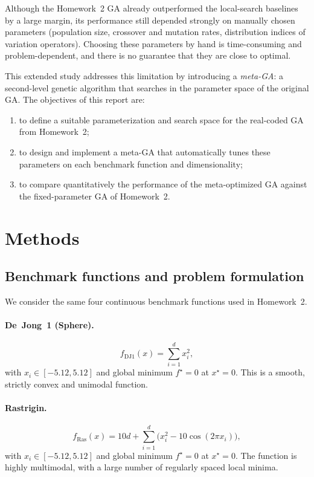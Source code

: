 \documentclass[11pt]{article}
\begin{document}
Although the Homework~2 GA already outperformed the local-search baselines
by a large margin, its performance still depended strongly on manually chosen
parameters (population size, crossover and mutation rates, distribution
indices of variation operators).
Choosing these parameters by hand is time-consuming and problem-dependent,
and there is no guarantee that they are close to optimal.

This extended study addresses this limitation by introducing a \emph{meta-GA}:
a second-level genetic algorithm that searches in the parameter space of the
original GA.
The objectives of this report are:
\begin{enumerate}
  \item to define a suitable parameterization and search space for the
        real-coded GA from Homework~2;
  \item to design and implement a meta-GA that automatically tunes these
        parameters on each benchmark function and dimensionality;
  \item to compare quantitatively the performance of the meta-optimized GA
        against the fixed-parameter GA of Homework~2.
\end{enumerate}

\section{Methods}

\subsection{Benchmark functions and problem formulation}

We consider the same four continuous benchmark functions used in Homework~2.

\paragraph{De~Jong~1 (Sphere).}
\begin{equation}
  f_{\text{DJ1}}(x) = \sum_{i=1}^{d} x_i^2,
\end{equation}
with $x_i \in [-5.12, 5.12]$ and global minimum $f^\star = 0$ at $x^\star = 0$.
This is a smooth, strictly convex and unimodal function.

\paragraph{Rastrigin.}
\begin{equation}
  f_{\text{Ras}}(x) = 10d + \sum_{i=1}^{d}
    \bigl( x_i^2 - 10 \cos (2\pi x_i)\bigr),
\end{equation}
with $x_i \in [-5.12, 5.12]$ and global minimum $f^\star = 0$ at $x^\star = 0$.
The function is highly multimodal, with a large number of regularly spaced
local minima.
\end{document}
